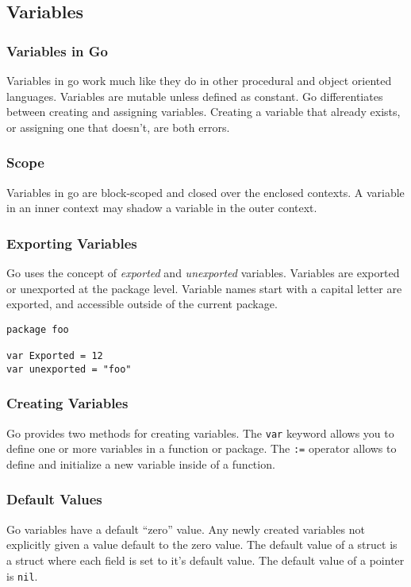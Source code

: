 \documentclass{beamer}
\begin{document}
\subsection{Variables}

\begin{frame}
  \frametitle{Variables in Go}
  Variables in go work much like they do in other procedural and
  object oriented languages.  Variables are mutable unless defined as
  constant.  Go differentiates between creating and assigning
  variables.  Creating a variable that already exists, or assigning
  one that doesn't, are both errors.
\end{frame}

\begin{frame}
  \frametitle{Scope}
  Variables in go are block-scoped and closed over the enclosed
  contexts.  A variable in an inner context may shadow a variable in
  the outer context.
\end{frame}

\begin{frame}[fragile]
  \frametitle{Exporting Variables}
  Go uses the concept of \emph{exported} and \emph{unexported}
  variables.  Variables are exported or unexported at the package
  level.  Variable names start with a capital letter are exported, and
  accessible outside of the current package.

\begin{lstlisting}[language=Golang]
package foo

var Exported = 12
var unexported = "foo"
\end{lstlisting}
\end{frame}

\begin{frame}
  \frametitle{Creating Variables}
  Go provides two methods for creating variables.  The {\tt var}
  keyword allows you to define one or more variables in a function or
  package.  The {\tt :=} operator allows to define and initialize a
  new variable inside of a function.
\end{frame}

\begin{frame}
  \frametitle{Default Values}
  Go variables have a default ``zero'' value.  Any newly created
  variables not explicitly given a value default to the zero value.
  The default value of a struct is a struct where each field is set to
  it's default value.  The default value of a pointer is {\tt nil}.
\end{frame}
\end{document}
